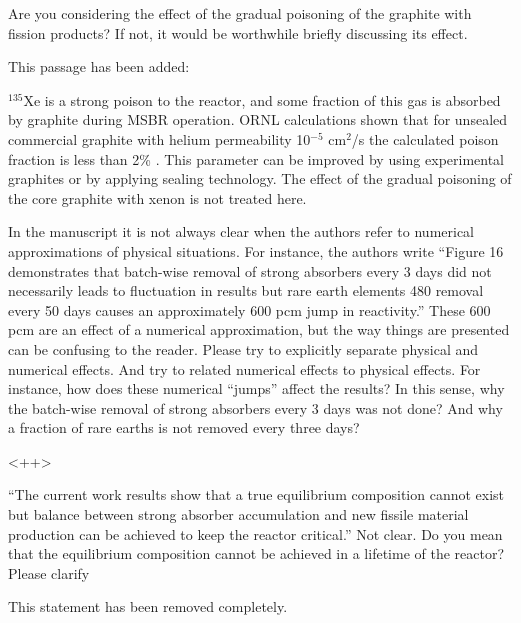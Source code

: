 \documentclass[answers,11pt]{exam}
\begin{document}
\begin{questions}

        \question Are you considering the effect of the gradual poisoning of 
        the graphite with fission products? If not, it would be worthwhile 
        briefly discussing its effect.
        \begin{solution}
                This passage has been added:
				
				$^{135}$Xe is a strong poison to the reactor, and some 
				fraction of this gas is absorbed by graphite during \gls{MSBR} 
				operation. ORNL calculations shown that for unsealed commercial 
				graphite with helium permeability 10$^{-5}$ cm$^2$/s the 
				calculated poison fraction is less than 2\% \cite{robertson_conceptual_1971}. 
				This parameter can be improved by using experimental graphites 
				or by applying sealing technology. The effect of the gradual 
				poisoning of the core graphite with xenon is not treated here.
        \end{solution}


        \question In the manuscript it is not always clear when the authors 
        refer to numerical approximations of physical situations. For instance, 
        the authors write ``Figure 16 demonstrates that batch-wise removal of 
        strong absorbers every 3 days did not necessarily leads to fluctuation 
        in results but rare earth elements 480 removal every 50 days causes an 
        approximately 600 pcm jump in reactivity.'' These 600 pcm are an effect 
        of a numerical approximation, but the way things are presented can be 
        confusing to the reader. Please try to explicitly separate physical and 
        numerical effects. And try to related numerical effects to physical 
        effects. For instance, how does these numerical ``jumps'' affect the 
        results?  In this sense, why the batch-wise removal of strong absorbers 
        every 3 days  was not done? And why a fraction of rare earths  is not 
        removed every three days?
        \begin{solution}
                <++>
        \end{solution}




        \question ``The current work results show that a true equilibrium 
        composition cannot exist but balance between strong absorber 
        accumulation and new fissile material production can be achieved to 
        keep the reactor critical.'' Not clear. Do you mean that the equilibrium 
        composition cannot be achieved in a lifetime of the reactor? Please 
        clarify
        \begin{solution}
                This statement has been removed completely.
        \end{solution}


\end{questions}
\end{document}
